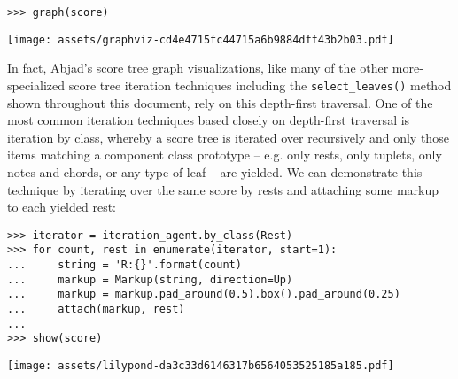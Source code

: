 \begin{comment}
<abjad>
graph(score)
</abjad>
\end{comment}

\begin{abjadbookoutput}
\begin{singlespacing}
\vspace{-0.5\baselineskip}
\begin{verbatim}
>>> graph(score)
\end{verbatim}
\noindent\texttt{[image: assets/graphviz-cd4e4715fc44715a6b9884dff43b2b03.pdf]}
\end{singlespacing}
\end{abjadbookoutput}

\noindent In fact, Abjad's score tree graph visualizations, like many of the
other more-specialized score tree iteration techniques including the
\texttt{select\_leaves()} method shown throughout this document, rely on this
depth-first traversal. One of the most common iteration techniques based
closely on depth-first traversal is iteration by class, whereby a score tree is
iterated over recursively and only those items matching a component class
prototype -- e.g. only rests, only tuplets, only notes and chords, or any type
of leaf -- are yielded. We can demonstrate this technique by iterating over the
same score by rests and attaching some markup to each yielded rest:

\begin{comment}
<abjad>
iterator = iteration_agent.by_class(Rest)
for count, rest in enumerate(iterator, start=1):
    string = 'R:{}'.format(count)
    markup = Markup(string, direction=Up)
    markup = markup.pad_around(0.5).box().pad_around(0.25)
    attach(markup, rest)

show(score)
</abjad>
\end{comment}

\begin{abjadbookoutput}
\begin{singlespacing}
\vspace{-0.5\baselineskip}
\begin{verbatim}
>>> iterator = iteration_agent.by_class(Rest)
>>> for count, rest in enumerate(iterator, start=1):
...     string = 'R:{}'.format(count)
...     markup = Markup(string, direction=Up)
...     markup = markup.pad_around(0.5).box().pad_around(0.25)
...     attach(markup, rest)
...
>>> show(score)
\end{verbatim}
\noindent\texttt{[image: assets/lilypond-da3c33d6146317b6564053525185a185.pdf]}
\end{singlespacing}
\end{abjadbookoutput}

